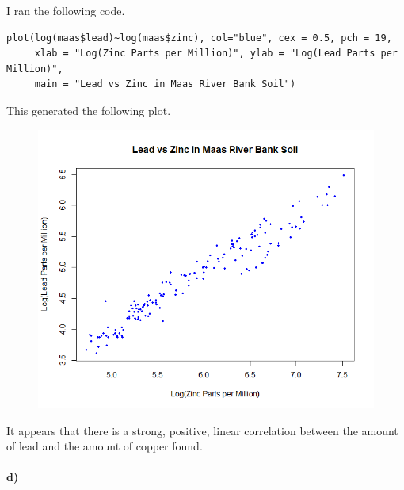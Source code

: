 \documentclass[12pt]{article}
\begin{document}
I ran the following code.
\scriptsize
\begin{verbatim}
plot(log(maas$lead)~log(maas$zinc), col="blue", cex = 0.5, pch = 19,
     xlab = "Log(Zinc Parts per Million)", ylab = "Log(Lead Parts per Million)",
     main = "Lead vs Zinc in Maas River Bank Soil")
\end{verbatim}
\normalsize
This generated the following plot.
\begin{figure}[H]
    \begin{center}
        \includegraphics[width=4.5in]{exercise3c.png}
    \end{center}
\end{figure}
It appears that there is a strong, positive, linear correlation between the amount of lead and
the amount of copper found.

\paragraph{d)}
\end{document}
